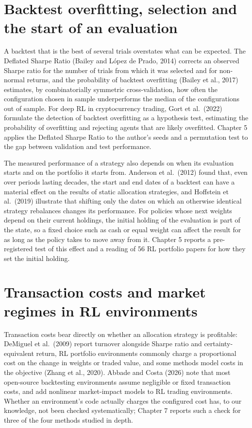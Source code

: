 \documentclass[12pt,a4paper]{report}
\begin{document}
\section{Backtest overfitting, selection and the start of an
evaluation}\label{backtest-overfitting-selection-and-the-start-of-an-evaluation}

A backtest that is the best of several trials overstates what can be
expected. The Deflated Sharpe Ratio (Bailey and López de Prado, 2014)
corrects an observed Sharpe ratio for the number of trials from which it
was selected and for non-normal returns, and the probability of backtest
overfitting (Bailey et al., 2017) estimates, by combinatorially
symmetric cross-validation, how often the configuration chosen in sample
underperforms the median of the configurations out of sample. For deep
RL in cryptocurrency trading, Gort et al.~(2022) formulate the detection
of backtest overfitting as a hypothesis test, estimating the probability
of overfitting and rejecting agents that are likely overfitted. Chapter
5 applies the Deflated Sharpe Ratio to the author's seeds and a
permutation test to the gap between validation and test performance.

The measured performance of a strategy also depends on when its
evaluation starts and on the portfolio it starts from. Anderson et
al.~(2012) found that, even over periods lasting decades, the start and
end dates of a backtest can have a material effect on the results of
static allocation strategies, and Hoffstein et al.~(2019) illustrate
that shifting only the dates on which an otherwise identical strategy
rebalances changes its performance. For policies whose next weights
depend on their current holdings, the initial holding of the evaluation
is part of the state, so a fixed choice such as cash or equal weight can
affect the result for as long as the policy takes to move away from it.
Chapter 5 reports a pre-registered test of this effect and a reading of
56 RL portfolio papers for how they set the initial holding.

\section{Transaction costs and market regimes in RL
environments}\label{transaction-costs-and-market-regimes-in-rl-environments}

Transaction costs bear directly on whether an allocation strategy is
profitable: DeMiguel et al.~(2009) report turnover alongside Sharpe
ratio and certainty-equivalent return, RL portfolio environments
commonly charge a proportional cost on the change in weights or traded
value, and some methods model costs in the objective (Zhang et al.,
2020). Abbade and Costa (2026) note that most open-source backtesting
environments assume negligible or fixed transaction costs, and add
nonlinear market-impact models to RL trading environments. Whether an
environment's code actually charges the configured cost has, to our
knowledge, not been checked systematically; Chapter 7 reports such a
check for three of the four methods studied in depth.
\end{document}
